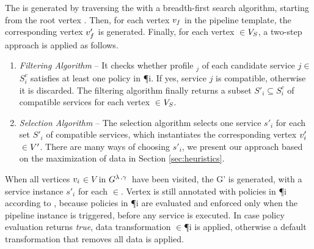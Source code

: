 The \pipelineInstance  is generated by traversing the \pipelineTemplate with a breadth-first search algorithm, starting from the root vertex .
Then, for each vertex $v_{f}$ in the pipeline template, the corresponding vertex $v'_{f}$ is generated.
Finally, for each vertex $\in$$V_S$, a two-step approach is applied as follows.

\begin{enumerate}
  \item \textit{Filtering Algorithm} -- It checks whether profile \profile$_j$ of each candidate service $\si{j}$$\in$$S^c_{i}$ satisfies at least one policy in \P{i}. If yes, service $\si{j}$ is compatible, otherwise it is discarded. The filtering algorithm finally returns a subset $S'_{i}$$\subseteq$$S^c_{i}$ of compatible services for each vertex $\in$$V_S$.
  \item \textit{Selection Algorithm} -- The selection algorithm selects one service $s'_i$ for each set $S'_{i}$ of compatible services, which instantiates the corresponding vertex $v'_{i}$$\in$$V'$. There are many ways of choosing $s'_i$, we present our approach based on the maximization of data \quality \emph{\q} in Section \ref{sec:heuristics}.
\end{enumerate}

When all vertices $v_{i}$$\in$$V$ in $G^{\lambda\,,\gamma\,}$ have been visited, the \pipelineInstance G' is generated, with a service instance $s'_i$ for each $\in$\Vp. Vertex  is still annotated with policies in \P{i} according to \myLambda, because policies in \P{i} are evaluated and enforced only when the pipeline instance is triggered, before any service is executed. In case policy evaluation returns \emph{true}, data transformation \TP$\in$\P{i} is applied, otherwise a default transformation that removes all data is applied.

